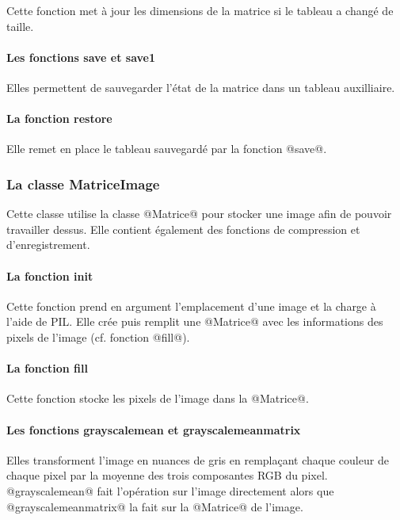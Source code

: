 \documentclass{article}
\begin{document}
Cette fonction met à jour les dimensions de la matrice si le tableau a changé de taille.

\paragraph{Les fonctions save et save1} 

Elles permettent de sauvegarder l'état de la matrice dans un tableau auxilliaire.

\paragraph{La fonction restore}

Elle remet en place le tableau sauvegardé par la fonction @save@.


\subsubsection{La classe MatriceImage}

Cette classe utilise la classe @Matrice@ pour stocker une image afin de pouvoir travailler dessus. Elle contient également des fonctions de compression et d'enregistrement.

\paragraph{La fonction init}

Cette fonction prend en argument l'emplacement d'une image et la charge à l'aide de PIL. Elle crée puis remplit une @Matrice@ avec les informations des pixels de l'image (cf. fonction @fill@).

\paragraph{La fonction fill}

Cette fonction stocke les pixels de l'image dans la @Matrice@.

\paragraph{Les fonctions grayscalemean et grayscalemeanmatrix}

Elles transforment l'image en nuances de gris en remplaçant chaque couleur de chaque pixel par la moyenne des trois composantes RGB du pixel.
@grayscalemean@ fait l'opération sur l'image directement alors que @grayscalemeanmatrix@ la fait sur la @Matrice@ de l'image.
\end{document}
